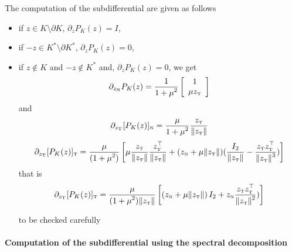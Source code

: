 The computation of the subdifferential are given as follows
\begin{itemize}
\item if $z\in K\setminus \partial K$, $\partial_z P_K(z) =I$,
\item if $-z \in K^*\setminus \partial K^*$, $\partial_z P_K(z) =0$,
\item if $z \notin K$ and $-z \notin K^*$ and, $\partial_z P_K(z) =0$, we get
\begin{equation}
  \label{eq:sub-proj_n}
  \partial_{z_\n} P_{K}(z) =
  \Frac 1 {1+\mu^2}
  \left[
    \begin{array}{c}
      1 \\
      \mu z_\t
    \end{array}\right] 
\end{equation}
and
\begin{equation}
  \label{eq:sub-proj_t1}
  \partial_{z_\t} [P_{K}(z)]_\n =
  \Frac \mu {1+\mu^2} \Frac {z_\t} {\|z_\t\|}
\end{equation}
\begin{equation}
  \label{eq:sub-proj_2}
  \partial_{z_\t} [P_{K}(z)]_\t =
  \Frac {\mu} {(1+\mu^2)} \left[\mu \Frac {z_\t} {\|z_\t\|} \Frac {z^\top_\t} {\|z_\t\|}+ (z_\n + \mu \|z_\t\|) (\Frac{I_2}{\|z_\t\|} - \Frac{z_\t z_\t^\top}{\|z_\t\|^3} )\right]
\end{equation}
that is
\begin{equation}
  \label{eq:sub-proj_2}
  \partial_{z_\t} [P_{K}(z)]_\t =
  \Frac {\mu} {(1+\mu^2)\|z_\t\|} \left[ (z_\n + \mu \|z_\t\|) \,I_2   +  z_\n  \Frac{z_\t z_\t^\top}{\|z_\t\|^2} )\right]
\end{equation}
\begin{ndrva}
  to be checked carefully
\end{ndrva}

\end{itemize}


\paragraph{Computation of the subdifferential using the spectral decomposition}



